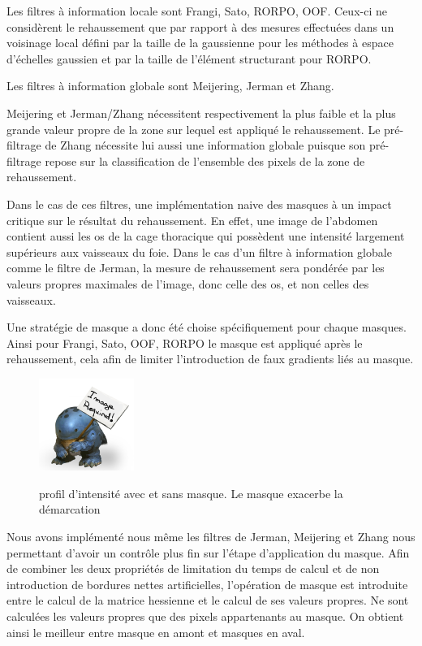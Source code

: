 Les filtres à information locale sont Frangi, Sato, RORPO, OOF. Ceux-ci ne considèrent le rehaussement que par rapport à des mesures effectuées dans un voisinage local défini par la taille de la gaussienne pour les méthodes à espace d'échelles gaussien et par la taille de l'élément structurant pour RORPO.

Les filtres à information globale sont Meijering, Jerman et Zhang.

Meijering et Jerman/Zhang nécessitent respectivement la plus faible et la plus grande valeur propre de la zone sur lequel est appliqué le rehaussement. Le pré-filtrage de Zhang nécessite lui aussi une information globale puisque son pré-filtrage repose sur la classification de l'ensemble des pixels de la zone de rehaussement.

Dans le cas de ces filtres, une implémentation naive des masques à un impact critique sur le résultat du rehaussement. En effet, une image de l'abdomen contient aussi les os de la cage thoracique qui possèdent une intensité largement supérieurs aux vaisseaux du foie. Dans le cas d'un filtre à information globale comme le filtre de Jerman, la mesure de rehaussement sera pondérée par les valeurs propres maximales de l'image, donc celle des os, et non celles des vaisseaux. 

Une stratégie de masque a donc été choise spécifiquement pour chaque masques. Ainsi pour Frangi, Sato, OOF, RORPO le masque est appliqué après le rehaussement, cela afin de limiter l'introduction de faux gradients liés au masque.

\begin{figure}
  \centering
  \includegraphics[height=3cm]{Images/img_required.jpg}
  \label{fig:mask_intensity_profile}
  \caption{profil d'intensité avec et sans masque. Le masque exacerbe la démarcation}
\end{figure}

Nous avons implémenté nous même les filtres de Jerman, Meijering et Zhang nous permettant d'avoir un contrôle plus fin sur l'étape d'application du masque. Afin de combiner les deux propriétés de limitation du temps de calcul et de non introduction de bordures nettes artificielles, l'opération de masque est introduite entre le calcul de la matrice hessienne et le calcul de ses valeurs propres. Ne sont calculées les valeurs propres que des pixels appartenants au masque. On obtient ainsi le meilleur entre masque en amont et masques en aval.

